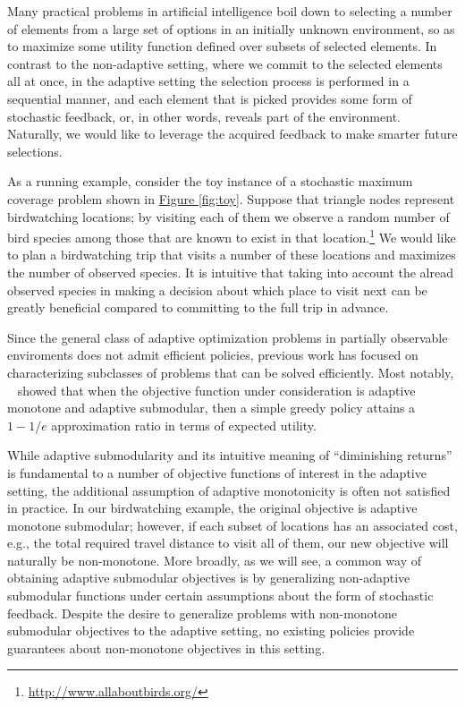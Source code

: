 \documentclass{article}
\newcommand{\figref}[1]{\hyperref[#1]{Figure \ref*{#1}}}
\newcommand{\citet}[1]{\citeauthor{#1}~\shortcite{#1}}
\begin{document}
Many practical problems in artificial intelligence boil down to selecting a number of elements from a large set of options in an initially unknown environment, so as to maximize some utility function defined over subsets of selected elements.
In contrast to the non-adaptive setting, where we commit to the selected elements all at once, in the adaptive setting the selection process is performed in a sequential manner, and each element that is picked provides some form of stochastic feedback, or, in other words, reveals part of the environment.
Naturally, we would like to leverage the acquired feedback to make smarter future selections.

As a running example, consider the toy instance of a stochastic maximum coverage problem shown in \figref{fig:toy}.
Suppose that triangle nodes represent birdwatching locations; by visiting each of them we observe a random number of bird species among those that are known to exist in that location.\footnote{\url{http://www.allaboutbirds.org/}}
We would like to plan a birdwatching trip that visits a number of these locations and maximizes the number of observed species.
It is intuitive that taking into account the alread observed species in making a decision about which place to visit next can be greatly beneficial compared to committing to the full trip in advance.

Since the general class of adaptive optimization problems in partially observable enviroments does not admit efficient policies, previous work has focused on characterizing subclasses of problems that can be solved efficiently.
Most notably, \citet{golovin11} showed that when the objective function under consideration is adaptive monotone and adaptive submodular, then a simple greedy policy attains a $1-1/e$ approximation ratio in terms of expected utility.

While adaptive submodularity and its intuitive meaning of ``diminishing returns'' is fundamental to a number of objective functions of interest in the adaptive setting, the additional assumption of adaptive monotonicity is often not satisfied in practice.
In our birdwatching example, the original objective is adaptive monotone submodular; however, if each subset of locations has an associated cost, e.g., the total required travel distance to visit all of them, our new objective will naturally be non-monotone.
More broadly, as we will see, a common way of obtaining adaptive submodular objectives is by generalizing non-adaptive submodular functions under certain assumptions about the form of stochastic feedback.
Despite the desire to generalize problems with non-monotone submodular objectives to the adaptive setting, no existing policies provide guarantees about non-monotone objectives in this setting.
\end{document}
